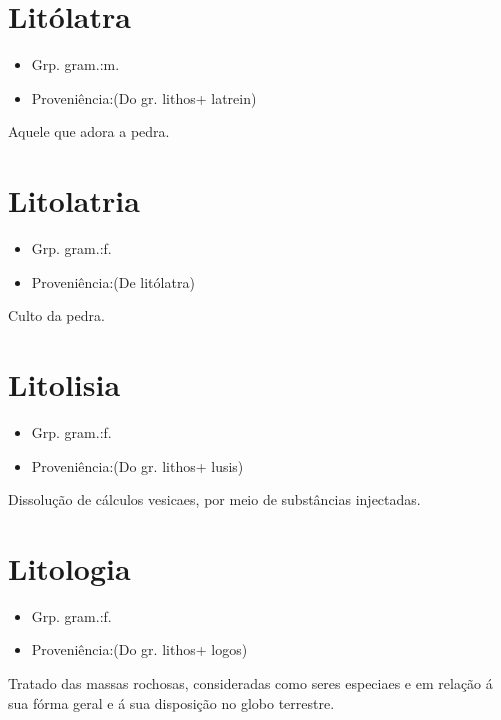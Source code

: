 \section{Litólatra}
\begin{itemize}
\item {Grp. gram.:m.}
\end{itemize}
\begin{itemize}
\item {Proveniência:(Do gr. \textunderscore lithos\textunderscore  + \textunderscore latrein\textunderscore )}
\end{itemize}
Aquele que adora a pedra.
\section{Litolatria}
\begin{itemize}
\item {Grp. gram.:f.}
\end{itemize}
\begin{itemize}
\item {Proveniência:(De \textunderscore litólatra\textunderscore )}
\end{itemize}
Culto da pedra.
\section{Litolisia}
\begin{itemize}
\item {Grp. gram.:f.}
\end{itemize}
\begin{itemize}
\item {Proveniência:(Do gr. \textunderscore lithos\textunderscore  + \textunderscore lusis\textunderscore )}
\end{itemize}
Dissolução de cálculos vesicaes, por meio de substâncias injectadas.
\section{Litologia}
\begin{itemize}
\item {Grp. gram.:f.}
\end{itemize}
\begin{itemize}
\item {Proveniência:(Do gr. \textunderscore lithos\textunderscore  + \textunderscore logos\textunderscore )}
\end{itemize}
Tratado das massas rochosas, consideradas como seres especiaes e em relação á sua fórma geral e á sua disposição no globo terrestre.
